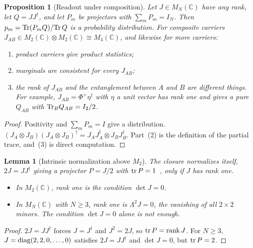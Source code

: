 \documentclass[11pt]{amsart}
\newtheorem{lemma}[theorem]{Lemma}
\newtheorem{proposition}[theorem]{Proposition}
\theoremstyle{definition}
\theoremstyle{remark}
\begin{document}
\begin{proposition}[Readout under composition]\label{prop:composition}
Let $J\in M_N(\mathbb C)$ have any rank, let $Q=JJ^\dagger$, and let $P_m$ be projectors with $\sum_mP_m=I_N$. Then $p_m={\rm Tr}(P_mQ)/{\rm Tr}\,Q$ is a probability distribution. For composite carriers $J_{AB}\in M_2(\mathbb C)\otimes M_2(\mathbb C)\cong M_4(\mathbb C)$, and likewise for more carriers:
\begin{enumerate}
\item product carriers give product statistics;
\item marginals are consistent for every $J_{AB}$;
\item the rank of $J_{AB}$ and the entanglement between $A$ and $B$ are different things. For example, $J_{AB}=\Phi^+\eta^\dagger$ with $\eta$ a unit vector has rank one and gives a pure $Q_{AB}$ with ${\rm Tr}_BQ_{AB}=I_2/2$.
\end{enumerate}
\end{proposition}

\begin{proof}
Positivity and $\sum_mP_m=I$ give a distribution. $(J_A\otimes J_B)(J_A\otimes J_B)^\dagger=J_AJ_A^\dagger\otimes J_BJ_B^\dagger$. Part~(2) is the definition of the partial trace, and~(3) is direct computation. \end{proof}

\begin{lemma}[Intrinsic normalization above $M_2$]\label{lem:minors}
The closure normalizes itself, $2J=JJ^\dagger$ giving a projector $P=J/2$ with ${\rm tr}\,P=1$~\cite{CAL}, only if $J$ has rank one.
\begin{itemize}
\item In $M_2(\mathbb C)$, rank one is the condition $\det J=0$.
\item In $M_N(\mathbb C)$ with $N\ge3$, rank one is $\Lambda^2J=0$, the vanishing of all $2\times2$ minors. The condition $\det J=0$ alone is not enough.
\end{itemize}
\end{lemma}

\begin{proof}
$2J=JJ^\dagger$ forces $J=J^\dagger$ and $J^2=2J$, so ${\rm tr}\,P={\rm rank}\,J$. For $N\ge3$, $J={\rm diag}(2,2,0,\dots,0)$ satisfies $2J=JJ^\dagger$ and $\det J=0$, but ${\rm tr}\,P=2$. \end{proof}
\end{document}
